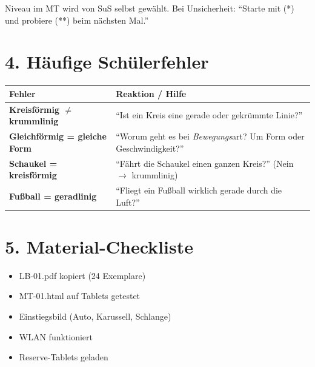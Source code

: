 \documentclass[11pt, a4paper]{article}
\newcommand{\lerngruppengroesse}{24}
\begin{document}
\vspace{0.5em}

\begin{tippbox}
Niveau im MT wird von SuS selbst gewählt. Bei Unsicherheit: ``Starte mit (*) und probiere (**) beim nächsten Mal.''
\end{tippbox}


\section*{4. Häufige Schülerfehler}

\begin{warnbox}
\begin{tabular}{|p{4cm}|p{8.5cm}|}
\hline
\textbf{Fehler} & \textbf{Reaktion / Hilfe} \\
\hline
\textbf{Kreisförmig $\neq$ krummlinig} & ``Ist ein Kreis eine gerade oder gekrümmte Linie?'' \\
\hline
\textbf{Gleichförmig = gleiche Form} & ``Worum geht es bei \textit{Bewegungs}art? Um Form oder Geschwindigkeit?'' \\
\hline
\textbf{Schaukel = kreisförmig} & ``Fährt die Schaukel einen ganzen Kreis?'' (Nein $\rightarrow$ krummlinig) \\
\hline
\textbf{Fußball = geradlinig} & ``Fliegt ein Fußball wirklich gerade durch die Luft?'' \\
\hline
\end{tabular}
\end{warnbox}


\section*{5. Material-Checkliste}

\begin{itemize}
    \item[$\Box$] LB-01.pdf kopiert (\lerngruppengroesse{} Exemplare)
    \item[$\Box$] MT-01.html auf Tablets getestet
    \item[$\Box$] Einstiegsbild (Auto, Karussell, Schlange)
    \item[$\Box$] WLAN funktioniert
    \item[$\Box$] Reserve-Tablets geladen
\end{itemize}
\end{document}
